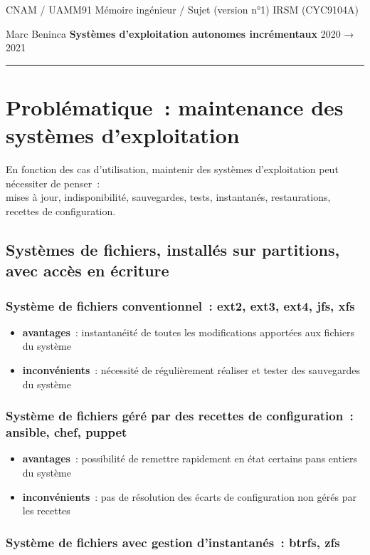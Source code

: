 \documentclass[10pt]{article}
\newcommand{\hr}{\rule{\textwidth}{1pt}}
\newenvironment{itmz}{\begin{itemize}
\setlength{\itemsep}{0em}
}{\end{itemize}}
\begin{document}
CNAM / UAMM91 \hfill Mémoire ingénieur / Sujet (version n°1) \hfill IRSM (CYC9104A)

Marc Beninca \hfill \textbf{Systèmes d’exploitation autonomes incrémentaux} \hfill 2020 → 2021

\hr

\section{Problématique : maintenance des systèmes d’exploitation}

En fonction des cas d’utilisation, maintenir des systèmes d’exploitation peut nécessiter de penser :\\
mises à jour, indisponibilité, sauvegardes, tests, instantanés, restaurations, recettes de configuration.

\subsection{Systèmes de fichiers, installés sur partitions, avec accès en écriture}

\subsubsection{Système de fichiers conventionnel : ext2, ext3, ext4, jfs, xfs}

\begin{itmz}
\item{\textbf{avantages} : instantanéité de toutes les modifications apportées aux fichiers du système}
\item{\textbf{inconvénients} : nécessité de régulièrement réaliser et tester des sauvegardes du système}
\end{itmz}

\subsubsection{Système de fichiers géré par des recettes de configuration : ansible, chef, puppet}

\begin{itmz}
\item{\textbf{avantages} : possibilité de remettre rapidement en état certains pans entiers du système}
\item{\textbf{inconvénients} : pas de résolution des écarts de configuration non gérés par les recettes}
\end{itmz}

\subsubsection{Système de fichiers avec gestion d’instantanés : btrfs, zfs}
\end{document}
